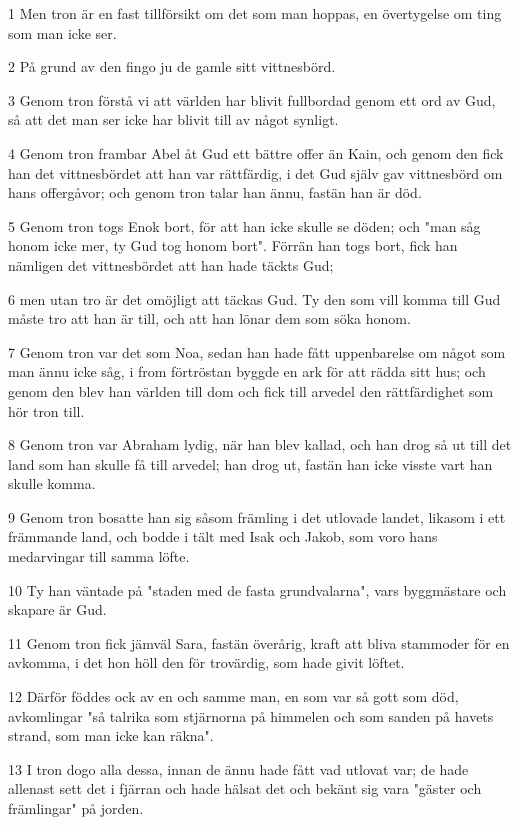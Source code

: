\par 1 Men tron är en fast tillförsikt om det som man hoppas, en övertygelse om ting som man icke ser.
\par 2 På grund av den fingo ju de gamle sitt vittnesbörd.
\par 3 Genom tron förstå vi att världen har blivit fullbordad genom ett ord av Gud, så att det man ser icke har blivit till av något synligt.
\par 4 Genom tron frambar Abel åt Gud ett bättre offer än Kain, och genom den fick han det vittnesbördet att han var rättfärdig, i det Gud själv gav vittnesbörd om hans offergåvor; och genom tron talar han ännu, fastän han är död.
\par 5 Genom tron togs Enok bort, för att han icke skulle se döden; och "man såg honom icke mer, ty Gud tog honom bort". Förrän han togs bort, fick han nämligen det vittnesbördet att han hade täckts Gud;
\par 6 men utan tro är det omöjligt att täckas Gud. Ty den som vill komma till Gud måste tro att han är till, och att han lönar dem som söka honom.
\par 7 Genom tron var det som Noa, sedan han hade fått uppenbarelse om något som man ännu icke såg, i from förtröstan byggde en ark för att rädda sitt hus; och genom den blev han världen till dom och fick till arvedel den rättfärdighet som hör tron till.
\par 8 Genom tron var Abraham lydig, när han blev kallad, och han drog så ut till det land som han skulle få till arvedel; han drog ut, fastän han icke visste vart han skulle komma.
\par 9 Genom tron bosatte han sig såsom främling i det utlovade landet, likasom i ett främmande land, och bodde i tält med Isak och Jakob, som voro hans medarvingar till samma löfte.
\par 10 Ty han väntade på "staden med de fasta grundvalarna", vars byggmästare och skapare är Gud.
\par 11 Genom tron fick jämväl Sara, fastän överårig, kraft att bliva stammoder för en avkomma, i det hon höll den för trovärdig, som hade givit löftet.
\par 12 Därför föddes ock av en och samme man, en som var så gott som död, avkomlingar "så talrika som stjärnorna på himmelen och som sanden på havets strand, som man icke kan räkna".
\par 13 I tron dogo alla dessa, innan de ännu hade fått vad utlovat var; de hade allenast sett det i fjärran och hade hälsat det och bekänt sig vara "gäster och främlingar" på jorden.
